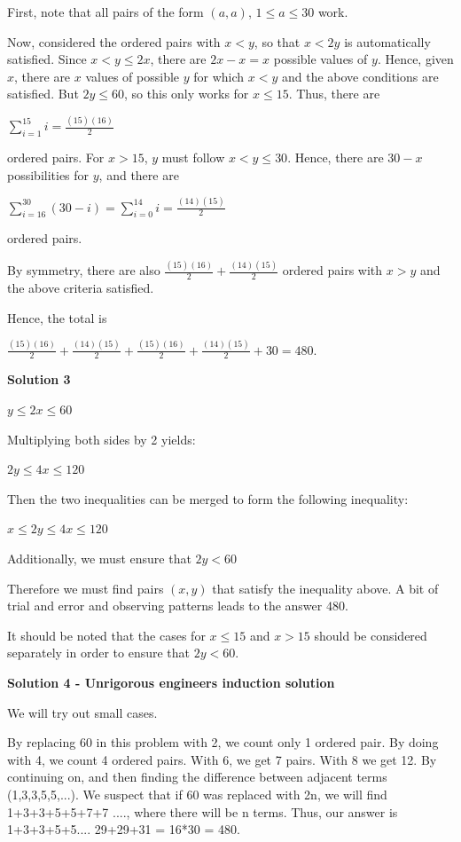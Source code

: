 \begin{enumerate}
First, note that all pairs of the form $(a,a)$, $1\le a\le30$ work.

 Now, considered the ordered pairs with $x < y$, so that $x < 2y$ is automatically satisfied. Since $x < y\le 2x$, there are $2x - x = x$ possible values of $y$. Hence, given $x$, there are $x$ values of possible $y$ for which $x < y$ and the above conditions are satisfied. But $2y\le60$, so this only works for $x\le15$. Thus, there are

 $\sum_{i=1}^{15} i=\frac{(15)(16)}{2}$

 ordered pairs. For $x > 15$, $y$ must follow $x < y\le 30$. Hence, there are $30 - x$ possibilities for $y$, and there are

 $\sum_{i=16}^{30}(30-i)=\sum_{i=0}^{14}i=\frac{(14)(15)}{2}$

 ordered pairs.

 By symmetry, there are also $\frac {(15)(16)}{2} + \frac {(14)(15)}{2}$ ordered pairs with $x > y$ and the above criteria satisfied.

 Hence, the total is

 $\frac{(15)(16)}{2}+\frac{(14)(15)}{2}+\frac{(15)(16)}{2}+\frac{(14)(15)}{2}+30=480.$




\textbf{Solution 3}

$y\le2x\le60$

 Multiplying both sides by 2 yields:

 $2y\le4x\le120$

 Then the two inequalities can be merged to form the following inequality:

 $x\le2y\le4x\le120$

 Additionally, we must ensure that $2y<60$

 Therefore we must find pairs $(x,y)$ that satisfy the inequality above. A bit of trial and error and observing patterns leads to the answer $480$.

 It should be noted that the cases for $x\le15$ and $x>15$ should be considered separately in order to ensure that $2y < 60$.

 



\textbf{Solution 4 - Unrigorous engineers induction solution}

We will try out small cases.

 By replacing 60 in this problem with 2, we count only 1 ordered pair. By doing with 4, we count 4 ordered pairs. With 6, we get 7 pairs. With 8 we get 12. By continuing on, and then finding the difference between adjacent terms (1,3,3,5,5,...). We suspect that if 60 was replaced with 2n, we will find 1+3+3+5+5+7+7 ...., where there will be n terms. Thus, our answer is 1+3+3+5+5.... 29+29+31 = 16*30 = 480.


\end{enumerate}
